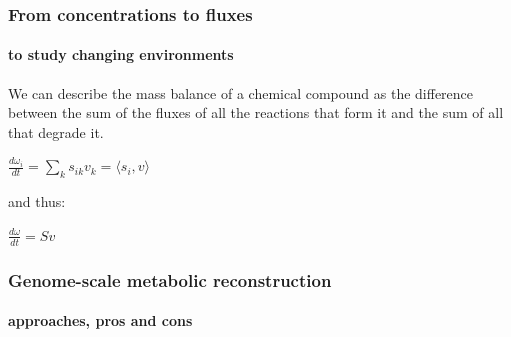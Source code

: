 \documentclass{beamer}
\begin{document}
   \begin{frame}
      \frametitle{From concentrations to fluxes}
      \framesubtitle{to study changing environments}

      We can describe the mass balance of a chemical compound as the difference between the sum of the 
      fluxes of all the reactions that form it and the sum of all that degrade it. 

      \bigskip 

      $\frac {d\omega_i}{dt} = \sum \limits_{k} s_{ik} v_k =  \langle  s_{i} , v \rangle  $

      \bigskip

      and thus:

      \bigskip 

      $\frac {d\omega}{dt} = Sv$

   \end{frame}
   \fi

   \begin{frame}
      \frametitle{Genome-scale metabolic reconstruction}
      \framesubtitle{approaches, pros and cons}      
      \begin{singlespace}
      \end{singlespace}
   \end{frame}
   
\end{document}
